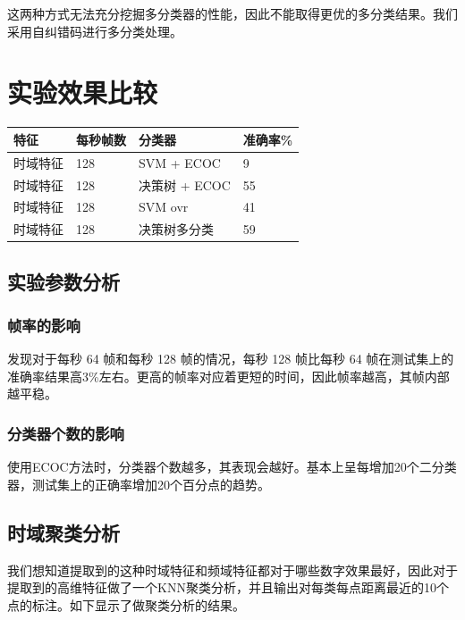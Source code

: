 这两种方式无法充分挖掘多分类器的性能，因此不能取得更优的多分类结果。我们采用自纠错码进行多分类处理。


\hypertarget{ux5b9eux9a8cux6548ux679cux6bd4ux8f83}{%
\section{实验效果比较}\label{ux5b9eux9a8cux6548ux679cux6bd4ux8f83}}

\begin{longtable}[]{@{}llll@{}}
特征 & 每秒帧数 & 分类器 & 准确率\% \tabularnewline
\endhead
时域特征 & 128 & SVM + ECOC & 9\tabularnewline
时域特征 & 128 & 决策树 + ECOC & 55\tabularnewline
时域特征 & 128 & SVM ovr & 41\tabularnewline
时域特征 & 128 & 决策树多分类 & 59\tabularnewline
\end{longtable}

\hypertarget{ux5b9eux9a8cux53c2ux6570ux5206ux6790}{%
\subsection{实验参数分析}\label{ux5b9eux9a8cux53c2ux6570ux5206ux6790}}

\hypertarget{ux5e27ux7387ux7684ux5f71ux54cd}{%
\subsubsection{帧率的影响}\label{ux5e27ux7387ux7684ux5f71ux54cd}}

发现对于每秒 64 帧和每秒 128 帧的情况，每秒 128 帧比每秒 64
帧在测试集上的准确率结果高3\%左右。更高的帧率对应着更短的时间，因此帧率越高，其帧内部越平稳。

\hypertarget{ux5206ux7c7bux5668ux4e2aux6570ux7684ux5f71ux54cd}{%
\subsubsection{分类器个数的影响}\label{ux5206ux7c7bux5668ux4e2aux6570ux7684ux5f71ux54cd}}

使用ECOC方法时，分类器个数越多，其表现会越好。基本上呈每增加20个二分类器，测试集上的正确率增加20个百分点的趋势。

\hypertarget{ux65f6ux57dfux805aux7c7bux5206ux6790}{%
\subsection{时域聚类分析}\label{ux65f6ux57dfux805aux7c7bux5206ux6790}}

我们想知道提取到的这种时域特征和频域特征都对于哪些数字效果最好，因此对于提取到的高维特征做了一个KNN聚类分析，并且输出对每类每点距离最近的10个点的标注。如下显示了做聚类分析的结果。


